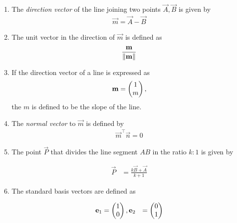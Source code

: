\documentclass[journal,12pt,twocolumn]{IEEEtran}
\renewcommand\thesection{\arabic{section}}
\renewcommand\thesubsection{\thesection.\arabic{subsection}}
\begin{document}
\begin{enumerate}[label=\thesubsection.\arabic*.,ref=\thesubsection.\theenumi]
  \item The {\em direction vector} of the line joining two points $\vec{A},\vec{B}$ is given by 
  \begin{align}
    \label{eq:dir_vec}
    \vec{m} = \vec{A}-\vec{B}
  \end{align}
\item The unit vector in the direction of $\vec{m}$ is defined as
\begin{align}
    \frac{\mathbf{m}}{\left\lVert\mathbf{m}\right\rVert}
\end{align}
\item If the direction vector of a line is expressed as 
	\begin{align}
    \mathbf{m} = \begin{pmatrix}1\\m\end{pmatrix},
\end{align}
 the $m$ is defined to be the {\em} slope of the line. 
  \item The {\em normal vector} to $\vec{m}$ is defined by 
  \begin{align}
    \label{eq:normal_vec}
    \vec{m}^{\top}  \vec{n} = 0
  \end{align}
  \item The point $\vec{P}$ that divides the line segment $AB$ in the ratio $k:1$  is given by 

  \begin{align}
	  \vec{P}&= \frac{k\vec{B}+ \vec{A}}{k+1}
	  \label{eq:section_formula}
  \end{align}
\item  The standard basis vectors are defined as 

  \begin{align}
  \mathbf{e}_1&= \begin{pmatrix}1\\0\end{pmatrix}, 
  \mathbf{e}_2&= \begin{pmatrix}0\\1\end{pmatrix} 
  \end{align}
\end{enumerate}
\end{document}
